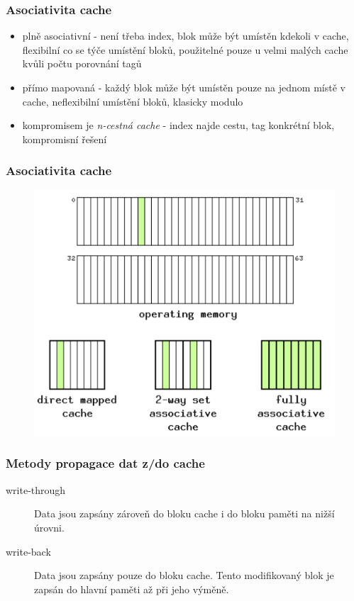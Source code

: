 \documentclass[professionalfonts,svgnames]{beamer}
\begin{document}
 \begin{frame}
\frametitle{Asociativita cache}
\begin{itemize}
\item plně asociativní - není třeba index, blok může být umístěn kdekoli v cache, flexibilní co se týče umístění bloků, použitelné pouze u velmi malých cache kvůli
počtu porovnání tagů
\item přímo mapovaná - každý blok může být umístěn pouze na jednom místě v cache, neflexibilní umístění bloků, klasicky modulo
\item kompromisem je \textit{n-cestná cache} - index najde cestu, tag konkrétní blok, kompromisní řešení
\end{itemize}
\end{frame}

 \begin{frame}
\frametitle{Asociativita cache}
\begin{figure}[h]
	\includegraphics[scale=0.5]{fig/cway}
\end{figure}
\end{frame}

 \begin{frame}
\frametitle{Metody propagace dat z/do cache}
\begin{description}
\item[write-through] Data jsou zapsány zároveň do bloku cache i do bloku paměti na nižší úrovni.
\item[write-back] Data jsou zapsány pouze do bloku cache. Tento modifikovaný blok je zapsán do hlavní paměti až při jeho výměně.
\end{description}
\end{frame}
\end{document}
